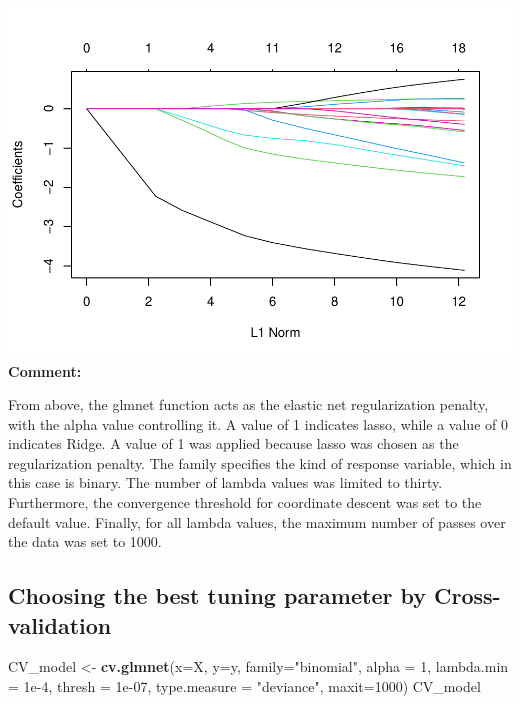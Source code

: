\documentclass[
  11pt,
]{article}
\newenvironment{Shaded}{\begin{snugshade}}{\end{snugshade}}
\newcommand{\AttributeTok}[1]{\textcolor[rgb]{0.13,0.29,0.53}{#1}}
\newcommand{\DecValTok}[1]{\textcolor[rgb]{0.00,0.00,0.81}{#1}}
\newcommand{\FloatTok}[1]{\textcolor[rgb]{0.00,0.00,0.81}{#1}}
\newcommand{\FunctionTok}[1]{\textcolor[rgb]{0.13,0.29,0.53}{\textbf{#1}}}
\newcommand{\NormalTok}[1]{#1}
\newcommand{\OtherTok}[1]{\textcolor[rgb]{0.56,0.35,0.01}{#1}}
\newcommand{\StringTok}[1]{\textcolor[rgb]{0.31,0.60,0.02}{#1}}
\begin{document}
\includegraphics[width=0.9\linewidth]{OWUSU_project_files/figure-latex/unnamed-chunk-18-1}\\
\textbf{Comment:}

From above, the glmnet function acts as the elastic net regularization
penalty, with the alpha value controlling it. A value of 1 indicates
lasso, while a value of 0 indicates Ridge. A value of 1 was applied
because lasso was chosen as the regularization penalty. The family
specifies the kind of response variable, which in this case is binary.
The number of lambda values was limited to thirty. Furthermore, the
convergence threshold for coordinate descent was set to the default
value. Finally, for all lambda values, the maximum number of passes over
the data was set to 1000.

\hfill\break

\subsection{Choosing the best tuning parameter by Cross-validation}

\begin{Shaded}
\begin{Highlighting}[]
\NormalTok{CV\_model }\OtherTok{\textless{}{-}} \FunctionTok{cv.glmnet}\NormalTok{(}\AttributeTok{x=}\NormalTok{X, }\AttributeTok{y=}\NormalTok{y, }\AttributeTok{family=}\StringTok{"binomial"}\NormalTok{, }\AttributeTok{alpha =} \DecValTok{1}\NormalTok{, }
    \AttributeTok{lambda.min =} \FloatTok{1e{-}4}\NormalTok{, }\AttributeTok{thresh =} \FloatTok{1e{-}07}\NormalTok{, }\AttributeTok{type.measure =} \StringTok{"deviance"}\NormalTok{, }
    \AttributeTok{maxit=}\DecValTok{1000}\NormalTok{)}
\NormalTok{CV\_model}
\end{Highlighting}
\end{Shaded}
\end{document}
